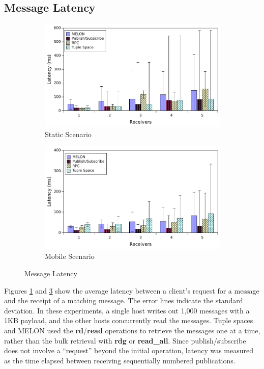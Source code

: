 \subsection{Message Latency}

\begin{figure}
\centering

\begin{subfigure}{.5\textwidth}
\centering
\includegraphics[width = \linewidth, clip, trim = 0px 0px 0px 0px]{figures/latency_static.pdf}
\caption{Static Scenario}
\label{fig:latencystatic}
\end{subfigure}%
\begin{subfigure}{.5\textwidth}
\centering
\includegraphics[width = \linewidth, clip, trim = 0px 0px 0px 0px]{figures/latency_mobile.pdf}
\caption{Mobile Scenario}
\label{fig:latencymobile}
\end{subfigure}

\caption{Message Latency}
\end{figure}

Figures \ref{fig:latencystatic} and \ref{fig:latencymobile} show the average latency between a client's request for a message and the receipt of a matching message. The error lines indicate the standard deviation. In these experiments, a single host writes out 1,000 messages with a 1KB payload, and the other hosts concurrently read the messages. Tuple spaces and MELON used the \textbf{rd}/\textbf{read} operations to retrieve the messages one at a time, rather than the bulk retrieval with \textbf{rdg} or \textbf{read\_all}. Since publish/subscribe does not involve a ``request'' beyond the initial operation, latency was measured as the time elapsed between receiving sequentially numbered publications.

